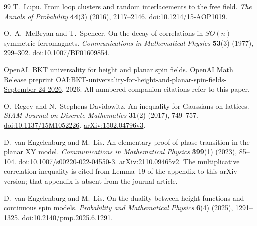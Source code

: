 \begin{thebibliography}{99}
T.~Lupu.
From loop clusters and random interlacements to the free field.
\emph{The Annals of Probability} \textbf{44}(3)
(2016), 2117--2146.
\href{https://doi.org/10.1214/15-AOP1019}{doi:10.1214/15-AOP1019}.

O.~A.~McBryan and T.~Spencer.
On the decay of correlations in \(SO(n)\)-symmetric ferromagnets.
\emph{Communications in Mathematical Physics} \textbf{53}(3)
(1977), 299--302.
\href{https://doi.org/10.1007/BF01609854}{doi:10.1007/BF01609854}.

OpenAI.
BKT universality for height and planar spin fields.
OpenAI Math Release preprint
\href{https://github.com/openai/math/blob/main/preprints/BKT-universality-for-height-and-planar-spin-fields-September-24-2026/paper.pdf}{OAI:BKT-universality-for-height-and-planar-spin-fields-September-24-2026},
2026.
All numbered companion citations refer to this paper.

O.~Regev and N.~Stephens-Davidowitz.
An inequality for Gaussians on lattices.
\emph{SIAM Journal on Discrete Mathematics}
\textbf{31}(2) (2017), 749--757.
\href{https://doi.org/10.1137/15M1052226}
{doi:10.1137/15M1052226}.
\href{https://arxiv.org/abs/1502.04796v3}{arXiv:1502.04796v3}.

D.~van Engelenburg and M.~Lis.
An elementary proof of phase transition in the planar XY model.
\emph{Communications in Mathematical Physics}
\textbf{399}(1) (2023), 85--104.
\href{https://doi.org/10.1007/s00220-022-04550-3}
{doi:10.1007/s00220-022-04550-3}.
\href{https://arxiv.org/abs/2110.09465v2}{arXiv:2110.09465v2}.
The multiplicative correlation inequality is cited from Lemma~19
of the appendix to this arXiv version; that appendix is absent
from the journal article.

D.~van Engelenburg and M.~Lis.
On the duality between height functions and continuous spin models.
\emph{Probability and Mathematical Physics} \textbf{6}(4)
(2025), 1291--1325.
\href{https://doi.org/10.2140/pmp.2025.6.1291}{doi:10.2140/pmp.2025.6.1291}.

\end{thebibliography}
